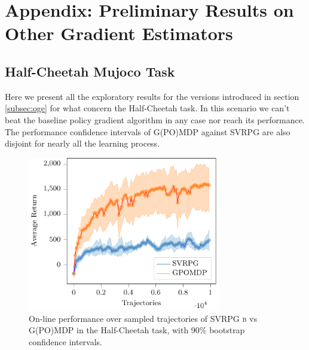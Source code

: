 \chapter{Appendix: Preliminary Results on Other Gradient Estimators}\label{chap:appendix}

\section{Half-Cheetah Mujoco Task}
\vspace{-0.05in}
Here we present all the exploratory results for the versions introduced in section \ref{subsec:oge} for what concern the Half-Cheetah task. In this scenario we can't beat the baseline policy gradient algorithm in any case nor reach its performance. The performance confidence intervals of G(PO)MDP against \acs{SVRPG} are also disjoint for nearly all the learning process.
\begin{figure}[h]
	\begin{minipage}[h]{1\textwidth}
		\centering
		\includegraphics[width=0.75\textwidth]{Images/Experiments/half_cheetah_GPOMDP_vs_NonSelf_SVRPG_B.pdf}
		\vspace{-0.1in}
		\caption{On-line performance over sampled trajectories of \acs{SVRPG} \textsc{b} vs G(PO)MDP in the Half-Cheetah task, with 90\% bootstrap confidence intervals.}
		\label{fig:hcthree}
	\end{minipage}
	\vspace{-0.15in}
\end{figure}
